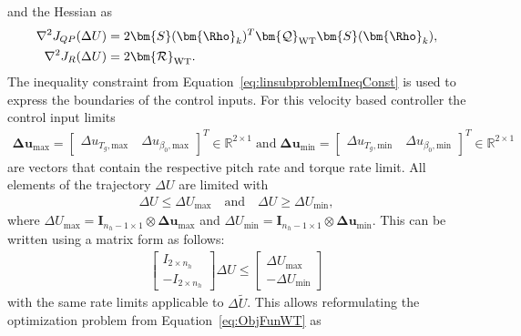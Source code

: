and the Hessian as
\begin{align*}
    \nabla^2 J_{QP}(\Delta U) &= 2\bm{S}(\bm{\Rho}_k)^T \bm{\mathcal{Q}}_{\text{WT}} \bm{S}(\bm{\Rho}_k),\\
    \nabla^2 J_R(\Delta U) &= 2 \bm{\mathcal{R}}_{\text{WT}}.
\end{align*}
The inequality constraint from Equation~\eqref{eq:linsubproblemIneqConst} is used to express the boundaries of the control inputs. For this velocity based controller the control input limits 
\begin{align*}
    \bm{\Delta u}_{\text{max}} = \begin{bmatrix} \Delta u_{T_g, \text{max}} \quad \Delta u_{\beta_0, \text{max}} \end{bmatrix}^T \in \mathbb{R}^{2 \times 1} \; \text{and}\; 
    \bm{\Delta u}_{\text{min}} = \begin{bmatrix} \Delta u_{T_g, \text{min}} \quad \Delta u_{\beta_0, \text{min}} \end{bmatrix}^T \in \mathbb{R}^{2 \times 1}
\end{align*}
are vectors that contain the respective pitch rate and torque rate limit. All elements of the trajectory $\Delta U$ are limited with
\begin{align*}
    \Delta U \leq \Delta U_{\text{max}} \quad \text{and} \quad \Delta U \geq \Delta U_{\text{min}},
\end{align*}
where $ \Delta U_{\text{max}} = \bm{I}_{n_h-1 \times 1}\otimes \bm{\Delta u}_{\text{max}}$  and $ \Delta U_{\text{min}} = \bm{I}_{n_h-1 \times 1}\otimes \bm{\Delta u}_{\text{min}}$.
%
This can be written using a matrix form as follows:
\begin{align*}
    \begin{bmatrix}
        I_{2 \times n_h} \\
        -I_{2 \times n_h}
    \end{bmatrix} \Delta U \leq
    \begin{bmatrix}
        \Delta U_{\text{max}} \\
        -\Delta U_{\text{min}}\end{bmatrix}
\end{align*}
with the same rate limits applicable to $\Delta \tilde{U}$. This allows reformulating the optimization problem from Equation~\eqref{eq:ObjFunWT} as %
